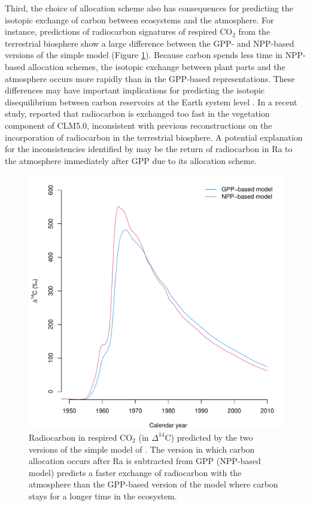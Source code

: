 \documentclass[bg, manuscript]{copernicus}
\begin{document}
Third, the choice of allocation scheme also has consequences for predicting the isotopic exchange of carbon between ecosystems and the atmosphere. For instance, predictions of radiocarbon signatures of respired CO$_2$ from the terrestrial biosphere show a large difference between the GPP- and NPP-based versions of the simple model (Figure \ref{fig:radiocarbon}). Because carbon spends less time in NPP-based allocation schemes, the isotopic exchange between plant parts and the atmosphere occurs more rapidly than in the GPP-based representations.
These differences may have important implications for predicting the isotopic disequilibrium between carbon reservoirs at the Earth system level \citep{Randerson2002, Levin2021, Frischnecht2022}. In a recent study, \citet{Frischnecht2022} reported that radiocarbon is exchanged too fast in the vegetation component of CLM5.0, inconsistent with previous reconstructions on the incorporation of radiocarbon in the terrestrial biosphere. A potential explanation for the inconsistencies identified by \citet{Frischnecht2022} may be the return of radiocarbon in Ra to the atmosphere immediately after GPP due to its allocation scheme. 

\begin{figure}[t]
   \centering
   \includegraphics[scale=0.9]{radiocarbon.pdf} %
   \caption{Radiocarbon in respired CO$_2$ (in $\Delta^{14}$C) predicted by the two versions of the simple model of \citet{Emanuel1981}. The version in which carbon allocation occurs after Ra is subtracted from GPP (NPP-based model) predicts a faster exchange of radiocarbon with the atmosphere than the GPP-based version of the model where carbon stays for a longer time in the ecosystem.}
   \label{fig:radiocarbon}
\end{figure}
\end{document}
